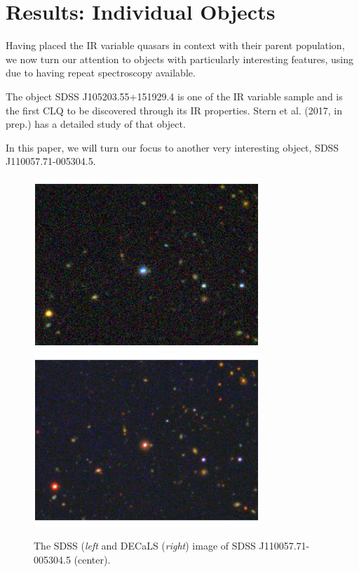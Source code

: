 \documentclass[apj]{emulateapj}
\begin{document}
\section{Results: Individual Objects}
Having placed the IR variable quasars in context with their parent 
population, we now turn our attention to objects with particularly interesting 
features, using due to having repeat spectroscopy available. 

The object SDSS J105203.55+151929.4 is one of the IR variable sample 
and is the first CLQ to be discovered through its IR properties. 
Stern et al. (2017, in prep.) has a detailed study of that object. 

In this paper, we will turn our focus to another very interesting object, 
SDSS J110057.71-005304.5. 

\begin{figure}
  \includegraphics[width=8.50cm, height=6.50cm, trim=0.0cm 0.0cm 0.0cm 0.0cm, clip]
  {../images/J110057_sdss_image_nolabels.pdf}
  \includegraphics[width=8.50cm, height=6.50cm, trim=0.0cm 0.0cm 0.0cm 0.0cm, clip]
  {../images/J110057_decals_image_nolabels.pdf}
  \centering
  \caption[]{The SDSS ({\it left} and DECaLS ({\it right}) image of SDSS J110057.71-005304.5 (center). } 
\label{fig:w1100m0052_sdss}
\end{figure}
\end{document}
